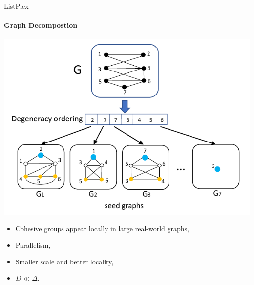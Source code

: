 \documentclass[9pt]{beamer} %
\begin{document}
\begin{frame}{ListPlex}
    \framesubtitle{Graph Decompostion}
    \centering
    \includegraphics[width=0.7\linewidth]{pic/degen.pdf}\\
    \begin{minipage}{0.45\linewidth}
        \begin{itemize}
            \item Cohesive groups appear locally in large real-world graphs,
            \item Parallelism,
        \end{itemize}
    \end{minipage}     
    \begin{minipage}{0.45\linewidth}
        \begin{itemize}
            \item Smaller scale and better locality,
            \item $D \ll \Delta$.
        \end{itemize}
    \end{minipage}
\end{frame}
\end{document}
